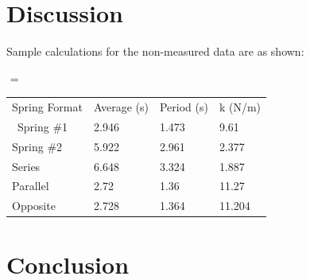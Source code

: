\documentclass[11pt, titlepage]{article}
\begin{document}
\section*{Discussion}
Sample calculations for the non-measured data are as shown:

$$ = 

\begin{center}
\begin{tabular}
{|m{8em}|m{8em}|m{8em}|m{8em}|}
Spring Format & Average (s) & Period (s) & k (N/m) \\\
Spring \#1 & 2.946 & 1.473 & 9.61 \\
Spring \#2 & 5.922 & 2.961 & 2.377 \\
Series & 6.648 & 3.324 & 1.887 \\
Parallel & 2.72 & 1.36 & 11.27 \\
Opposite & 2.728 & 1.364 & 11.204 \\
\end{tabular}
\end{center}


\section*{Conclusion}
\end{document}
